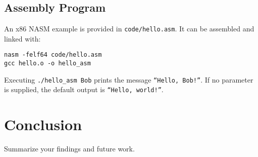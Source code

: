 \documentclass{article}
\begin{document}
\subsection{Assembly Program}
An x86 NASM example is provided in \verb|code/hello.asm|.
It can be assembled and linked with:
\begin{verbatim}
nasm -felf64 code/hello.asm
gcc hello.o -o hello_asm
\end{verbatim}
Executing \verb|./hello_asm Bob| prints the message
\texttt{``Hello, Bob!''}. If no parameter is supplied, the default output is
\texttt{``Hello, world!''}.

\section{Conclusion}
Summarize your findings and future work.



\end{document}

